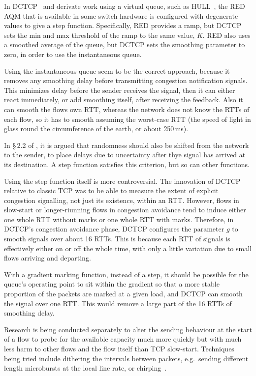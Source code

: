 In DCTCP~\cite{Alizadeh10:DCTCP} and derivate work using a virtual queue, such as HULL~\cite{Alizadeh12:HULL}, the RED AQM that is available in some switch hardware is configured with degenerate values to give a step function. Specifically, RED provides a ramp, but DCTCP sets the min and max threshold of the ramp to the same value, \(K\). RED also uses a smoothed average of the queue, but DCTCP sets the smoothing parameter to zero, in order to use the instantaneous queue.

Using the instantaneous queue seem to be the correct approach, because it removes any smoothing delay before transmitting congestion notification signals. This minimizes delay before the sender receives the signal, then it can either react immediately, or add smoothing itself, after receiving the feedback. Also it can smooth the flows own RTT, whereas the network does not know the RTTs of each flow, so it has to smooth assuming the worst-case RTT (the speed of light in glass round the circumference of the earth, or about 250\,ms).

In \S\,2.2 of \cite{Briscoe17c:l4saqm_TR}, it is argued that randomness should also be shifted from the network to the sender, to place delays due to uncertainty after thye signal has arrived at its destination. A step function satisfies this criterion, but so can other functions.

Using the step function itself is more controversial. The innovation of DCTCP relative to classic TCP was to be able to measure the extent of explicit congestion signalling, not just its existence, within an RTT. However, flows in slow-start or longer-riunning flows in congestion avoidance tend to induce either one whole RTT without marks or one whole RTT with marks. Therefore, in DCTCP's congestion avoidance phase, DCTCP configures the parameter \(g\) to smooth signals over about 16 RTTs. This is because each RTT of signals is effectively either on or off the whole time, with only a little variation due to small flows arriving and departing.

With a gradient marking function, instead of a step, it should be possible for the queue's operating point to sit within the gradient so that a more stable proportion of the packets are marked at a given load, and DCTCP can smooth the signal over one RTT. This would remove a large part of the 16 RTTs of smoothing delay. 

Research is being conducted separately to alter the sending behaviour at the start of a flow to probe for the available capacity much more quickly but with much less harm to other flows and the flow itself than TCP slow-start. Techniques being tried include dithering the intervals between packets, e.g.\ sending different length microbursts at the local line rate, or chirping~\cite{Kuehlewind10b:chirp_impl}.


